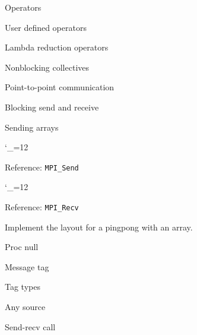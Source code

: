 \documentclass[10pt]{beamer}
\newcommand\referenceframe{\begingroup\catcode`\_=12 \referenceframett}
\gdef\referenceframett#1{
  \begin{numberedframe}{Reference: \texttt{MPI_#1}}
    \small
    
  \end{numberedframe}\endgroup}
\begin{document}
\begin{numberedframe}{Operators}
  
\end{numberedframe}
\begin{numberedframe}{User defined operators}
  
\end{numberedframe}
\begin{numberedframe}{Lambda reduction operators}
  
\end{numberedframe}
\begin{numberedframe}{Nonblocking collectives}
  
\end{numberedframe}

 {Point-to-point communication}

\begin{numberedframe}{Blocking send and receive}
  
\end{numberedframe}
\begin{numberedframe}{Sending arrays}
  
\end{numberedframe}
\referenceframe{Send}
\referenceframe{Recv}

\begin{exerciseframe}[pingpongbuffer]
  Implement the layout for a pingpong with an array.
\end{exerciseframe}

\begin{numberedframe}{Proc null}
  
\end{numberedframe}
\begin{numberedframe}{Message tag}
  
\end{numberedframe}
\begin{numberedframe}{Tag types}
  
\end{numberedframe}
\begin{numberedframe}{Any source}
  
\end{numberedframe}
\begin{numberedframe}{Send-recv call}
  
\end{numberedframe}
\end{document}
